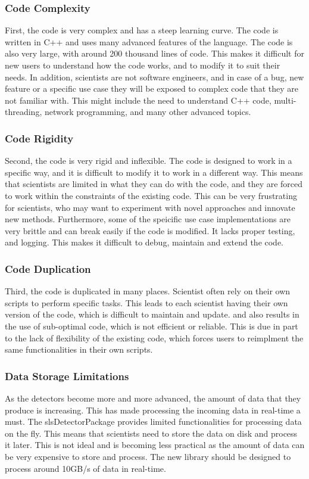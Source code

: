 \begin{spacing}{1.2}
    \subsubsection{Code Complexity}
    First, the code is very complex and has a steep learning curve. The code is written in C++ and uses
    many advanced features of the language. The code is also very large, with around 200 thousand lines of code.
    This makes it difficult for new users to understand how the code works, and to modify it to suit their needs.
    In addition, scientists are not software engineers, and in case of a bug, new feature or a specific use case
    they will be exposed to complex code that they are not familiar with. This might include the need to understand
    C++ code, multi-threading, network programming, and many other advanced topics.


    \subsubsection{Code Rigidity}
    Second, the code is very rigid and inflexible. The code is designed to work in a specific way, and it is difficult
    to modify it to work in a different way. This means that scientists are limited in what they can do with the code,
    and they are forced to work within the constraints of the existing code. This can be very frustrating for scientists,
    who may want to experiment with novel approaches and innovate new methods.
    Furthermore, some of the speicific use case implementations are very brittle and can break easily if the code is modified.
    It lacks proper testing, and logging. This makes it difficult to debug, maintain and extend the code.


    \subsubsection{Code Duplication}
    Third, the code is duplicated in many places. Scientist often rely on their own scripts to
    perform specific tasks.    This leads to each scientist having their own version of the
    code, which is difficult to maintain and update.    and also results in the use of
    sub-optimal code, which is not efficient or reliable. This is due in part to the lack of
    flexibility of the existing code, which forces users to reimplment the same functionalities
    in their own scripts.


    \subsubsection{Data Storage Limitations}
    As the detectors become more and more advanced, the amount of data that they produce is increasing.
    This has made processing the incoming data in real-time a must. The slsDetectorPackage provides limited
    functionalities for processing data on the fly. This means that scientists need to store the data on disk
    and process it later. This is not ideal and is becoming less practical as the amount of data can be very expensive to
    store and process. The new library should be designed to process around 10GB/s of data in real-time.


\end{spacing}
